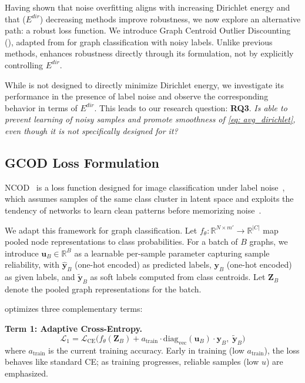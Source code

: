 Having shown that noise overfitting aligns with increasing Dirichlet energy and that ($E^{dir}$) decreasing methods improve robustness, we now explore an alternative path: a robust loss function. We introduce Graph Centroid Outlier Discounting (\method), adapted from \cite{wani2023combining} for graph classification with noisy labels. Unlike previous methods, \method enhances robustness directly through its formulation, not by explicitly controlling $E^{dir}$.

While \method is not designed to directly minimize Dirichlet energy, we investigate its performance in the presence of label noise and observe the corresponding behavior in terms of $E^{dir}$. This leads to our research question: \textbf{RQ3}. \textit{Is \method able to prevent learning of noisy samples and promote smoothness of \eqref{eq: avg_dirichlet}, even though it is not specifically designed for it?}

\subsection{GCOD Loss Formulation}

NCOD~\cite{wani2023combining} is a loss function designed for image classification under label noise~\cite{memorizenoise}, which assumes samples of the same class cluster in latent space and exploits the tendency of networks to learn clean patterns before memorizing noise~\cite{arpit2017closer}.

We adapt this framework for graph classification. Let $f_{\theta}: \mathbb{R}^{N \times m'} \rightarrow \mathbb{R}^{|C|}$ map pooled node representations to class probabilities. For a batch of $B$ graphs, we introduce $\mathbf{u}_B \in \mathbb{R}^B$ as a learnable per-sample parameter capturing sample reliability, with $\mathbf{\hat{y}}_B$ (one-hot encoded) as predicted labels, $\mathbf{y}_B$ (one-hot encoded) as given labels, and $\mathbf{\tilde{y}}_B$ as soft labels computed from class centroids. Let $\mathbf{Z}_B$ denote the pooled graph representations for the batch.

\method optimizes three complementary terms:

\textbf{Term 1: Adaptive Cross-Entropy.}
\begin{equation}
\label{eq:gcod1}
\mathcal{L}_1 = \mathcal{L}_{\text{CE}}\big(f_{\theta}(\mathbf{Z}_B) + a_{\text{train}} \cdot \text{diag}_\text{vec}(\mathbf{u}_B) \cdot \mathbf{y}_B,\; \mathbf{\tilde{y}}_B\big)
\end{equation}
where $a_{\text{train}}$ is the current training accuracy. Early in training (low $a_{\text{train}}$), the loss behaves like standard CE; as training progresses, reliable samples (low $u$) are emphasized.

